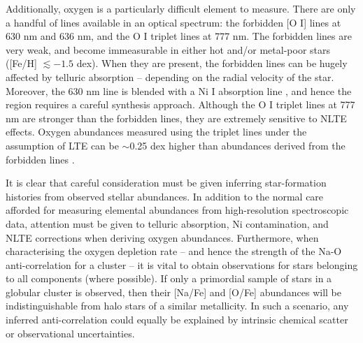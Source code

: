 \documentclass{emulateapj}
\begin{document}
 
Additionally, oxygen is a particularly difficult element to measure. There are only a handful of lines available in an optical spectrum: the forbidden [O \textsc{I}] lines at 630 nm and 636 nm, and the O \textsc{I} triplet lines at 777 nm. The forbidden lines are very weak, and become immeasurable in either hot and/or metal-poor stars ([Fe/H] $\lesssim -1.5$ dex). When they are present, the forbidden lines can be hugely affected by telluric absorption -- depending on the radial velocity of the star. Moreover, the 630 nm line is blended with a Ni \textsc{I} absorption line \citep{Allende-Prieto;et-al_2001}, and hence the region requires a careful synthesis approach. Although the O \textsc{I} triplet lines at 777 nm are stronger than the forbidden lines, they are extremely sensitive to NLTE effects. Oxygen abundances measured using the triplet lines under the assumption of LTE can be $\sim$0.25 dex higher than abundances derived from the forbidden lines \citep{Perez;et-al_2006}.


It is clear that careful consideration must be given inferring star-formation histories from observed stellar abundances. In addition to the normal care afforded for measuring elemental abundances from high-resolution spectroscopic data, attention must be given to telluric absorption, Ni contamination, and NLTE corrections when deriving oxygen abundances. Furthermore, when characterising the oxygen depletion rate -- and hence the strength of the Na-O anti-correlation for a cluster -- it is vital to obtain observations for stars belonging to all components (where possible). If only a primordial sample of stars in a globular cluster is observed, then their [Na/Fe] and [O/Fe] abundances will be indistinguishable from halo stars of a similar metallicity. In such a scenario, any inferred anti-correlation could equally be explained by intrinsic chemical scatter or observational uncertainties.


\end{document}

